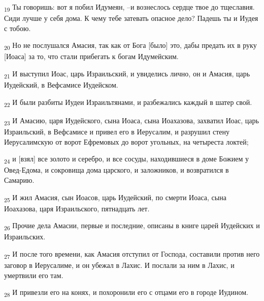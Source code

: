\begin{tcolorbox}
\textsubscript{19} Ты говоришь: вот я побил Идумеян, --и вознеслось сердце твое до тщеславия. Сиди лучше у себя дома. К чему тебе затевать опасное дело? Падешь ты и Иудея с тобою.
\end{tcolorbox}
\begin{tcolorbox}
\textsubscript{20} Но не послушался Амасия, так как от Бога [было] это, дабы предать их в руку [Иоаса] за то, что стали прибегать к богам Идумейским.
\end{tcolorbox}
\begin{tcolorbox}
\textsubscript{21} И выступил Иоас, царь Израильский, и увиделись лично, он и Амасия, царь Иудейский, в Вефсамисе Иудейском.
\end{tcolorbox}
\begin{tcolorbox}
\textsubscript{22} И были разбиты Иудеи Израильтянами, и разбежались каждый в шатер свой.
\end{tcolorbox}
\begin{tcolorbox}
\textsubscript{23} И Амасию, царя Иудейского, сына Иоаса, сына Иоахазова, захватил Иоас, царь Израильский, в Вефсамисе и привел его в Иерусалим, и разрушил стену Иерусалимскую от ворот Ефремовых до ворот угольных, на четыреста локтей;
\end{tcolorbox}
\begin{tcolorbox}
\textsubscript{24} и [взял] все золото и серебро, и все сосуды, находившиеся в доме Божием у Овед-Едома, и сокровища дома царского, и заложников, и возвратился в Самарию.
\end{tcolorbox}
\begin{tcolorbox}
\textsubscript{25} И жил Амасия, сын Иоасов, царь Иудейский, по смерти Иоаса, сына Иоахазова, царя Израильского, пятнадцать лет.
\end{tcolorbox}
\begin{tcolorbox}
\textsubscript{26} Прочие дела Амасии, первые и последние, описаны в книге царей Иудейских и Израильских.
\end{tcolorbox}
\begin{tcolorbox}
\textsubscript{27} И после того времени, как Амасия отступил от Господа, составили против него заговор в Иерусалиме, и он убежал в Лахис. И послали за ним в Лахис, и умертвили его там.
\end{tcolorbox}
\begin{tcolorbox}
\textsubscript{28} И привезли его на конях, и похоронили его с отцами его в городе Иудином.
\end{tcolorbox}
